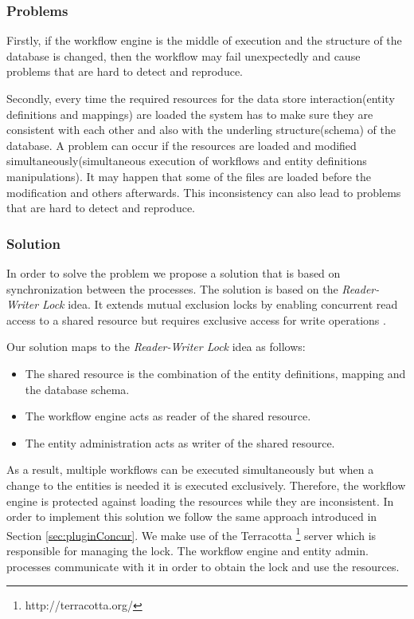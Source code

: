 \subsubsection{Problems}
Firstly, if the workflow engine is the middle of execution and the structure of the database is changed, then the workflow may fail unexpectedly and cause problems that are hard to detect and reproduce. 

Secondly, every time the required resources for the data store interaction(entity definitions and mappings) are loaded the system has to make sure they are consistent with each other and also with the underling structure(schema) of the database. A problem can occur if the resources are loaded and modified simultaneously(simultaneous execution of workflows and entity definitions manipulations). It may happen that some of the files are loaded before the modification and others afterwards. This inconsistency can also lead to problems that are hard to detect and reproduce.

\subsubsection{Solution}

In order to solve the problem we propose a solution that is based on synchronization between the processes. The solution is based on the \textit{Reader-Writer Lock} idea. It extends mutual exclusion locks by enabling concurrent read access to a shared resource but requires exclusive access for write operations \cite{lev2009scalable}.

Our solution maps to the \textit{Reader-Writer Lock} idea as follows:
\begin{itemize}
	\item The shared resource is the combination of the entity definitions, mapping and the database schema.
	\item The workflow engine acts as reader of the shared resource.
	\item The entity administration acts as writer of the shared resource.
\end{itemize}
As a result, multiple workflows can be executed simultaneously but when a change to the entities is needed it is executed exclusively. Therefore, the workflow engine is protected against loading the resources while they are inconsistent. In order to implement this solution we follow the same approach introduced in Section \ref{sec:pluginConcur}. We make use of the Terracotta \footnote{http://terracotta.org/} server which is responsible for managing the lock. The workflow engine and entity admin. processes communicate with it in order to obtain the lock and use the resources.

